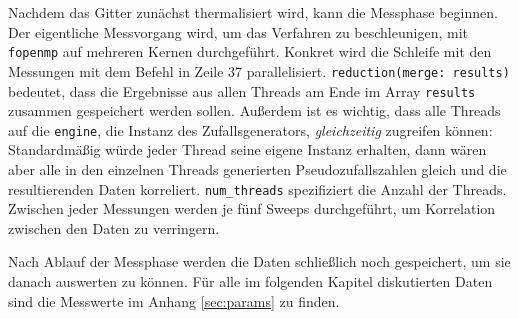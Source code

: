Nachdem das Gitter zunächst thermalisiert wird, kann die Messphase beginnen.
Der eigentliche Messvorgang wird, um das Verfahren zu
beschleunigen, mit \texttt{fopenmp} auf mehreren Kernen durchgeführt. Konkret wird
die Schleife mit den Messungen mit dem Befehl in Zeile 37 parallelisiert.
\texttt{reduction(merge: results)} bedeutet, dass die Ergebnisse aus allen Threads
am Ende im Array \texttt{results} zusammen gespeichert werden sollen. Außerdem
ist es wichtig, dass alle Threads
auf die \texttt{engine}, die Instanz des Zufallsgenerators, \emph{gleichzeitig}
zugreifen können: Standardmäßig würde jeder Thread seine eigene Instanz erhalten,
dann wären aber alle in den einzelnen Threads generierten Pseudozufallszahlen gleich
und die resultierenden Daten korreliert. \texttt{num\_threads} spezifiziert die
Anzahl der Threads. Zwischen jeder Messungen werden je fünf Sweeps
durchgeführt, um Korrelation zwischen den Daten zu verringern.

Nach Ablauf der Messphase werden die Daten schließlich noch gespeichert, um sie
danach auswerten zu können. Für alle im folgenden Kapitel diskutierten Daten sind
die Messwerte im Anhang \ref{sec:params} zu finden.
